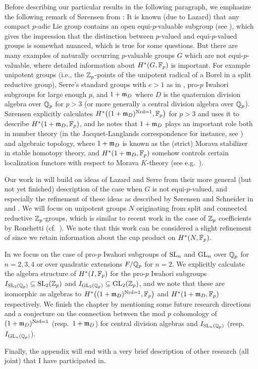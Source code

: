 Before describing our particular results in the following paragraph, we emphasize the following remark of Sørensen from \cite{Sor}: It is known (due to Lazard) that any compact $p$-adic Lie group contains an open equi-$p$-valuable subgroup (see \cite[Chap.~V~2.2.7.1]{Laz}), which gives the impression that the distinction between $p$-valued and equi-$p$-valued groups is somewhat nuanced, which is true for some questions. But there are many examples of naturally occurring $p$-valuable groups $G$ which are not equi-$p$-valuable, where detailed information about $H^{*}(G,\mathbb{F}_{p})$ is important. For example unipotent groups (i.e., the $\mathbb{Z}_{p}$-points of the unipotent radical of a Borel in a split reductive group), Serre's standard groups with $e>1$ as in \cite[Lem.~2.2.2]{Laz-complements}, pro-$p$ Iwahori subgroups for large enough $p$, and $1 + \mathfrak{m}_{D}$ where $D$ is the quaternion division algebra over $\mathbb{Q}_{p}$ for $p > 3$ (or more generally a central division algebra over $\mathbb{Q}_{p}$). Sørensen explicitly calculates $H^{*}\bigl( (1+\mathfrak{m}_{D})^{\operatorname{Nrd} = 1} , \mathbb{F}_{p} \bigr)$ for $p>3$ and uses it to describe $H^{*}(1+\mathfrak{m}_{D},\mathbb{F}_{p})$, and he notes that $1+\mathfrak{m}_{D}$ plays an important role both in number theory (in the Jacquet-Langlands correspondence for instance, see \cite{JL}) and algebraic topology, where $1+\mathfrak{m}_{D}$ is known as the (strict) Morava stabilizer in stable homotopy theory, and $H^{*}(1+\mathfrak{m}_{D},\mathbb{F}_{p})$ somehow controls certain localization functors with respect to Morava $K$-theory (see e.g.\ \cite{Henn}).

Our work in  will build on ideas of Lazard and Serre from their more general (but not yet finished) description of the case when $G$ is not equi-$p$-valued, and especially the refinement of these ideas as described by Sørensen and Schneider in \cite{Sor} and \cite{Sch-notes}. We will focus on unipotent groups $N$ originating from split and connected reductive $\mathbb{Z}_p$-groups, which is similar to recent work in the case of $\mathbb{Z}_p$ coefficients by Ronchetti (cf.\ \cite{Ron}). We note that this work can be considered a slight refinement of \cite{GK} since we retain information about the cup product on $H^{*}(N,\mathbb{F}_{p})$.

In  we focus on the case of pro-$p$ Iwahori subgroups of $\operatorname{SL}_{n}$ and $\operatorname{GL}_{n}$ over $\mathbb{Q}_{p}$ for $n=2,3,4$ or over quadratic extensions $F/\mathbb{Q}_{p}$ for $n=2$. We explicitly calculate the algebra structure of $H^{*}(I,\mathbb{F}_{p})$ for the pro-$p$ Iwahori subgroups $I_{\operatorname{SL}_{2}(\mathbb{Q}_{p})} \subseteq \operatorname{SL}_{2}(\mathbb{Z}_{p})$ and $I_{\operatorname{GL}_{2}(\mathbb{Q}_{p})} \subseteq \operatorname{GL}_{2}(\mathbb{Z}_{p})$, and we note that these are isomorphic as algebras to $H^{*}\bigl( (1+\mathfrak{m}_{D})^{\operatorname{Nrd} = 1},\mathbb{F}_{p} \bigr)$ and $H^{*}(1+\mathfrak{m}_{D},\mathbb{F}_{p})$ respectively. We finish the chapter by mentioning some future research directions and a conjecture on the connection between the mod $p$ cohomology of $(1+\mathfrak{m}_{D})^{\operatorname{Nrd} = 1}$ (resp.\ $1+\mathfrak{m}_{D}$) for central division algebras and $I_{\operatorname{SL}_{n}(\mathbb{Q}_{p})}$ (resp.\ $I_{\operatorname{GL}_{n}(\mathbb{Q}_{p})}$).

Finally, the appendix will end with a very brief description of other research (all joint) that I have participated in.


